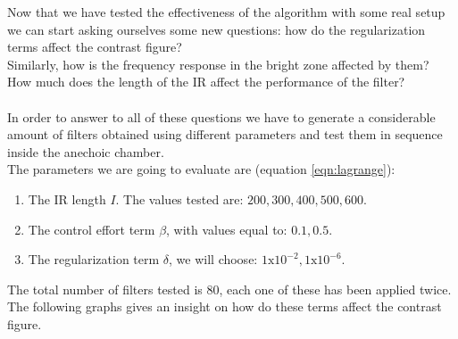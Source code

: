 Now that we have tested the effectiveness of the algorithm with some real setup we can start asking ourselves some new questions: how do the regularization terms affect the contrast figure?
\\
Similarly, how is the frequency response in the bright zone affected by them? 
\\
How much does the length of the IR affect the performance of the filter?
\\
\\
In order to answer to all of these questions we have to generate a considerable amount of filters obtained using different parameters and test them in sequence inside the anechoic chamber.
\\
The parameters we are going to evaluate are (equation \ref{eqn:lagrange}):
\begin{enumerate}
\item The IR length $I$. The values tested are: $200, 300, 400, 500, 600$.
\item The control effort term $\beta$, with values equal to: $0.1, 0.5$.
\item The regularization term $\delta$, we will choose: $1\text{x}10^{-2}, 1\text{x}10^{-6}$.
\end{enumerate}
The total number of filters tested is $80$, each one of these has been applied twice. The following graphs gives an insight on how do these terms affect the contrast figure.
 
